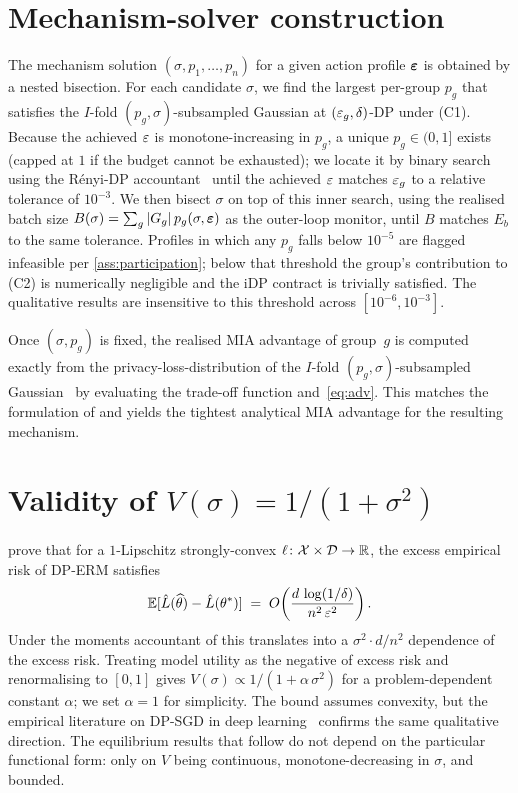 \appendices

\section{Mechanism-solver construction}
\label{app:mechanism}

The mechanism solution $(\sigma, p_1,\dots,p_n)$ for a given action profile
$\boldsymbol{\varepsilon}$ is obtained by a nested bisection. For each candidate
$\sigma$, we find the largest per-group $p_g$ that satisfies the $I$-fold
$(p_g, \sigma)$-subsampled Gaussian at $(\varepsilon_g, \delta)$-DP under (C1).
Because the achieved $\varepsilon$ is monotone-increasing in $p_g$, a unique $p_g
\in (0, 1]$ exists (capped at $1$ if the budget cannot be exhausted); we
locate it by binary search using the R\'enyi-DP
accountant~\cite{mironov2017renyi} until the achieved $\varepsilon$ matches
$\varepsilon_g$ to a relative tolerance of $10^{-3}$. We then bisect $\sigma$ on
top of this inner search, using the realised batch size $B(\sigma) =
\sum_g |G_g|\, p_g(\sigma, \boldsymbol{\varepsilon})$ as the outer-loop monitor,
until $B$ matches $E_b$ to the same tolerance. Profiles in which any $p_g$
falls below $10^{-5}$ are flagged infeasible per
\cref{ass:participation}; below that threshold the group's contribution to
(C2) is numerically negligible and the iDP contract is trivially
satisfied. The qualitative results are insensitive to this threshold
across $[10^{-6}, 10^{-3}]$.

Once $(\sigma, p_g)$ is fixed, the realised MIA advantage of group~$g$ is
computed exactly from the privacy-loss-distribution of the $I$-fold
$(p_g, \sigma)$-subsampled Gaussian~\cite{google-dp-accounting} by
evaluating the trade-off function and~\eqref{eq:adv}. This matches the
formulation of \citet{kaiser2026your} and yields the tightest analytical
MIA advantage for the resulting mechanism.

\section{Validity of $V(\sigma) = 1/(1+\sigma^2)$}
\label{app:V}

\citet{bassily2014private} prove that for a $1$-Lipschitz strongly-convex
$\ell\colon \mathcal{X} \times \mathcal{D} \to \mathbb{R}$, the excess empirical
risk of DP-ERM satisfies
\[
\mathbb{E}[\hat L(\widehat\theta) - \hat L(\theta^*)]
\;=\; O\!\left(\frac{d\,\log(1/\delta)}{n^2\,\varepsilon^2}\right).
\]
Under the moments accountant of \citet{abadi2016deep} this translates into
a $\sigma^2 \cdot d / n^2$ dependence of the excess risk. Treating model
utility as the negative of excess risk and renormalising to $[0, 1]$
gives $V(\sigma) \propto 1/(1 + \alpha\,\sigma^2)$ for a problem-dependent
constant $\alpha$; we set $\alpha = 1$ for simplicity. The bound assumes
convexity, but the empirical literature on DP-SGD in deep
learning~\cite{tramer2021private, abadi2016deep, boenisch2023have} confirms
the same qualitative direction. The equilibrium results that follow do
not depend on the particular functional form: only on $V$ being
continuous, monotone-decreasing in $\sigma$, and bounded.

